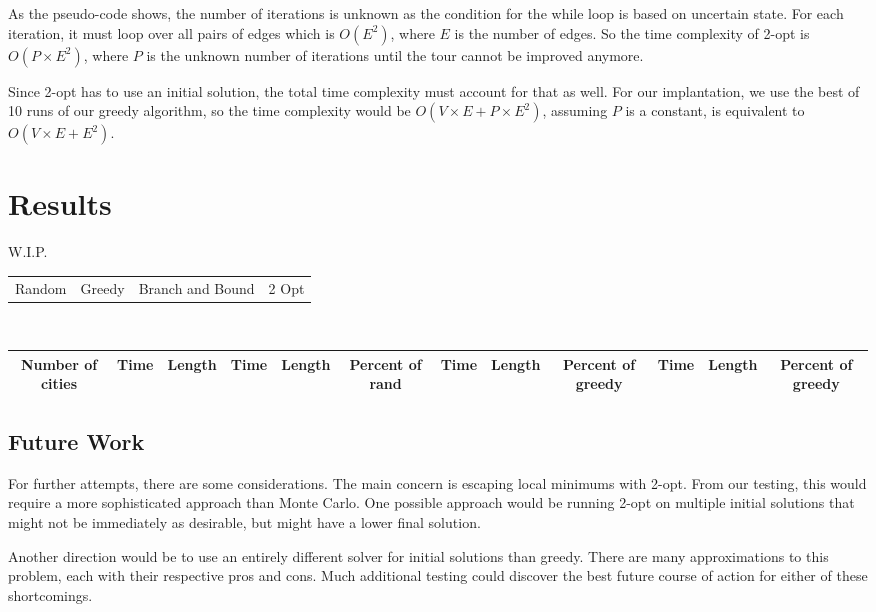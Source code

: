 \documentclass[12pt]{report}
\begin{document}
\begin{multicols}{2}
    As the pseudo-code shows, the number of iterations is unknown as the condition for the while loop is based on uncertain state. For each iteration, it must loop over all pairs of edges which is $O(E^2)$, where $E$ is the number of edges. So the time complexity of 2-opt is $O(P \times E^2)$, where $P$ is the unknown number of iterations until the tour cannot be improved anymore.

    Since 2-opt has to use an initial solution, the total time complexity must account for that as well. For our implantation, we use the best of 10 runs of our greedy algorithm, so the time complexity would be $O(V \times E + P \times E^2)$, assuming $P$ is a constant, is equivalent to $O(V \times E + E^2)$.
\end{multicols}

    \newcommand*{\TitleParbox}[1]{\parbox[c]{1.75cm}{\raggedright #1}}%
    \section{Results}
    W.I.P.
    \small
    \begin{adjustwidth}{-100pt}{100pt}
    \begin{tabular}{|c|c|c|c|}
        \hline
         Random & Greedy & Branch and Bound & 2 Opt \\
    \end{tabular}\\
    \begin{tabular}{|c|cc|ccc|ccc|ccc|}
        \hline
        \parbox[c]{1.5cm}{\raggedright Number of cities} & \parbox[c]{1cm}{\raggedright Time } \vline & \parbox[c]{1cm}{\raggedright Length }&
        \parbox[c]{1.5cm}{\raggedright Time } & Length & \parbox[c]{1.5cm}{\raggedright Percent of rand } &
        Time & Length & \parbox[c]{1.5cm}{\raggedright Percent of greedy } &
        Time & Length & \parbox[c]{1.5cm}{\raggedright Percent of greedy }\\
        \hline
    \end{tabular}
    \end{adjustwidth}

\begin{multicols}{2}
    \section{Future Work}
    For further attempts, there are some considerations. The main concern is escaping local minimums with 2-opt. From our testing, this would require a more sophisticated approach than Monte Carlo. One possible approach would be running 2-opt on multiple initial solutions that might not be immediately as desirable, but might have a lower final solution.

    Another direction would be to use an entirely different solver for initial solutions than greedy. There are many approximations to this problem, each with their respective pros and cons. Much additional testing could discover the best future course of action for either of these shortcomings.
\end{multicols}

% 
%
\end{document}
